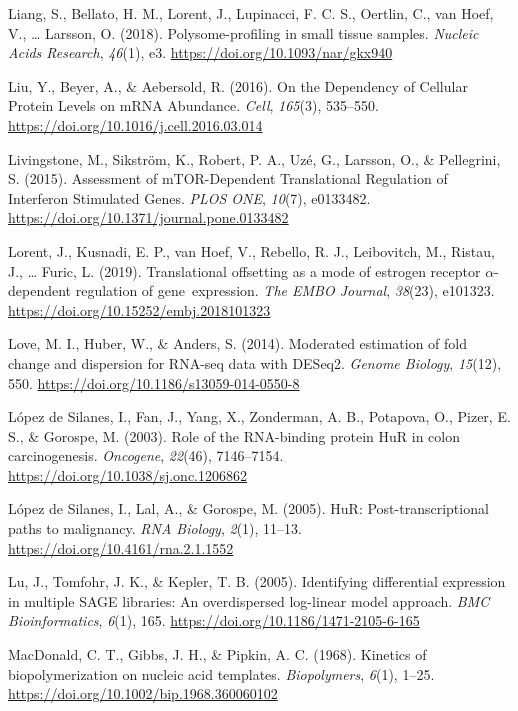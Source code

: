 \documentclass[12pt,openany]{book}
\begin{document}
\hypertarget{ref-Liang2018}{}
Liang, S., Bellato, H. M., Lorent, J., Lupinacci, F. C. S., Oertlin, C.,
van Hoef, V., \ldots{} Larsson, O. (2018). Polysome-profiling in small
tissue samples. \emph{Nucleic Acids Research}, \emph{46}(1), e3.
\url{https://doi.org/10.1093/nar/gkx940}

\hypertarget{ref-Liu2016}{}
Liu, Y., Beyer, A., \& Aebersold, R. (2016). On the Dependency of
Cellular Protein Levels on mRNA Abundance. \emph{Cell}, \emph{165}(3),
535--550. \url{https://doi.org/10.1016/j.cell.2016.03.014}

\hypertarget{ref-Livingstone2015}{}
Livingstone, M., Sikström, K., Robert, P. A., Uzé, G., Larsson, O., \&
Pellegrini, S. (2015). Assessment of mTOR-Dependent Translational
Regulation of Interferon Stimulated Genes. \emph{PLOS ONE},
\emph{10}(7), e0133482.
\url{https://doi.org/10.1371/journal.pone.0133482}

\hypertarget{ref-Lorent2019}{}
Lorent, J., Kusnadi, E. P., van Hoef, V., Rebello, R. J., Leibovitch,
M., Ristau, J., \ldots{} Furic, L. (2019). Translational offsetting as a
mode of estrogen receptor \(\alpha\)-dependent regulation of
gene~expression. \emph{The EMBO Journal}, \emph{38}(23), e101323.
\url{https://doi.org/10.15252/embj.2018101323}

\hypertarget{ref-Love2014}{}
Love, M. I., Huber, W., \& Anders, S. (2014). Moderated estimation of
fold change and dispersion for RNA-seq data with DESeq2. \emph{Genome
Biology}, \emph{15}(12), 550.
\url{https://doi.org/10.1186/s13059-014-0550-8}

\hypertarget{ref-LopezdeSilanes2003}{}
López de Silanes, I., Fan, J., Yang, X., Zonderman, A. B., Potapova, O.,
Pizer, E. S., \& Gorospe, M. (2003). Role of the RNA-binding protein HuR
in colon carcinogenesis. \emph{Oncogene}, \emph{22}(46), 7146--7154.
\url{https://doi.org/10.1038/sj.onc.1206862}

\hypertarget{ref-LopezdeSilanes2005}{}
López de Silanes, I., Lal, A., \& Gorospe, M. (2005). HuR:
Post-transcriptional paths to malignancy. \emph{RNA Biology},
\emph{2}(1), 11--13. \url{https://doi.org/10.4161/rna.2.1.1552}

\hypertarget{ref-Lu2005}{}
Lu, J., Tomfohr, J. K., \& Kepler, T. B. (2005). Identifying
differential expression in multiple SAGE libraries: An overdispersed
log-linear model approach. \emph{BMC Bioinformatics}, \emph{6}(1), 165.
\url{https://doi.org/10.1186/1471-2105-6-165}

\hypertarget{ref-MacDonald1968a}{}
MacDonald, C. T., Gibbs, J. H., \& Pipkin, A. C. (1968). Kinetics of
biopolymerization on nucleic acid templates. \emph{Biopolymers},
\emph{6}(1), 1--25. \url{https://doi.org/10.1002/bip.1968.360060102}
\end{document}
